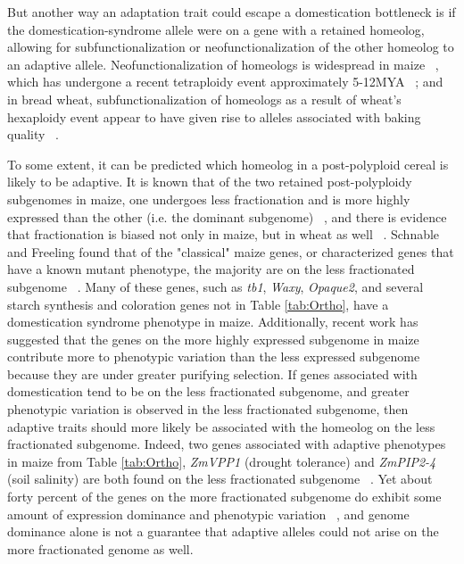 \documentclass[12pt]{article}
\begin{document}
But another way an adaptation trait could escape a domestication bottleneck is if the domestication-syndrome allele were on a gene with a retained homeolog, allowing for subfunctionalization or neofunctionalization of the other homeolog to an adaptive allele.  Neofunctionalization of homeologs is widespread in maize ~\citep{Hughes2014}, which has undergone a recent tetraploidy event approximately 5-12MYA ~\citep{Swigonova2004}; and in bread wheat, subfunctionalization of homeologs as a result of  wheat's hexaploidy event appear to have given rise to alleles associated with baking quality ~\citep{Pfeifer2014}.  

To some extent, it can be predicted which homeolog in a post-polyploid cereal is likely to be adaptive. It is known that of the two retained post-polyploidy subgenomes in maize, one undergoes less fractionation and is more highly expressed than the other (i.e. the dominant subgenome) ~\citep{Woodhouse2010, Schnable2011}, and there is evidence that fractionation is biased not only in maize, but in wheat as well ~\citep{Eckardt2014}.  Schnable and Freeling found that of the "classical" maize genes, or characterized genes that have a known mutant phenotype, the majority are on the less fractionated subgenome ~\citep{Schnable20112}. Many of these genes, such as \textit{tb1}, \textit{Waxy}, \textit{Opaque2}, and several starch synthesis and coloration genes not in Table \ref{tab:Ortho}, have a domestication syndrome phenotype in maize.  Additionally, recent work has suggested that the genes on the more highly expressed subgenome in maize contribute more to phenotypic variation than the less expressed subgenome ~\citep{RennyByfield2017} because they are under greater purifying selection.  If genes associated with domestication tend to be on the less fractionated subgenome, and greater phenotypic variation is observed in the less fractionated subgenome, then adaptive traits should more likely be associated with the homeolog on the less fractionated subgenome.  Indeed, two genes associated with adaptive phenotypes in maize from Table \ref{tab:Ortho}, \textit{ZmVPP1} (drought tolerance) and \textit{ZmPIP2-4} (soil salinity) are both found on the less fractionated subgenome ~\citep{Schnable20112}. Yet about forty percent of the genes on the more fractionated subgenome do exhibit some amount of expression dominance and phenotypic variation ~\citep{RennyByfield2017}, and genome dominance alone is not a guarantee that adaptive alleles could not arise on the more fractionated genome as well.  
\end{document}
